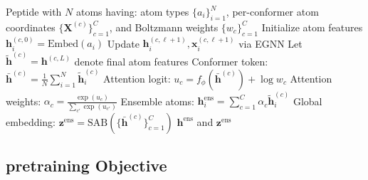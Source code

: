 \documentclass{article}
\begin{document}
\begin{algorithm}[h]
   \caption{EnsembleEGNN Conformer-Aware Fusion Forward Pass}
   \label{alg:fusion}
\begin{algorithmic}[1]
    Peptide with $N$ atoms having: 
   \Statex \hspace{1.1cm} atom types $\{a_i\}_{i=1}^N$,
   \Statex \hspace{1.1cm} per-conformer atom coordinates $\{\mathbf{X}^{(c)}\}_{c=1}^C$, 
   \Statex \hspace{1.1cm} and Boltzmann weights $\{w_c\}_{c=1}^C$
   \State Initialize atom features $\mathbf{h}_i^{(c,0)} = \mathrm{Embed}(a_i)$
       \State Update $\mathbf{h}_i^{(c,\ell+1)}, \mathbf{x}_i^{(c,\ell+1)}$ via EGNN 
   \EndFor
   \State Let $\tilde{\mathbf{h}}^{(c)} = \mathbf{h}^{(c,L)}$ denote final atom features
       \State Conformer token: $\bar{\mathbf{h}}^{(c)} = \frac{1}{N} \sum_{i=1}^N \tilde{\mathbf{h}}_i^{(c)}$
       \State Attention logit: $u_c = f_\phi(\bar{\mathbf{h}}^{(c)}) + \log w_c$
   \EndFor
   \State Attention weights: $\alpha_c = \frac{\exp(u_c)}{\sum_{c'} \exp(u_{c'})}$
   \State Ensemble atoms: $\mathbf{h}_i^{\mathrm{ens}} = \sum_{c=1}^C \alpha_c \tilde{\mathbf{h}}_i^{(c)}$
   \State Global embedding: $\mathbf{z}^{\mathrm{ens}} = \mathrm{SAB}(\{\bar{\mathbf{h}}^{(c)}\}_{c=1}^C)$
    $\mathbf{h}^{\mathrm{ens}}$ and $\mathbf{z}^{\mathrm{ens}}$
\end{algorithmic}
\end{algorithm}


\subsection{pretraining Objective}
\label{sec:pretrain}
\end{document}
